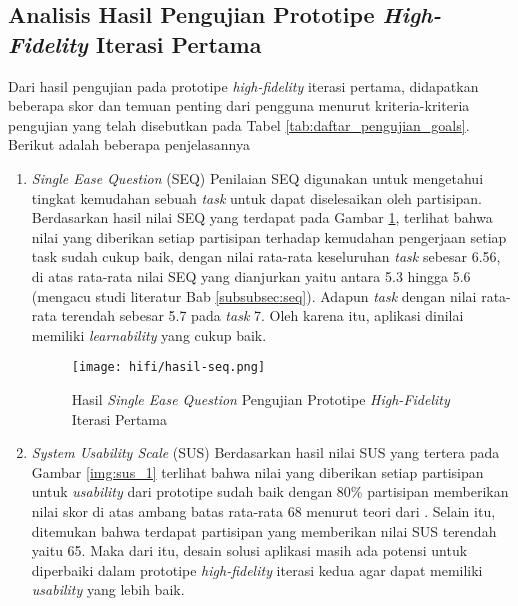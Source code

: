 \newpage

\subsection{Analisis Hasil Pengujian Prototipe \textit{High-Fidelity} Iterasi Pertama}
\label{subsec:test_1_analisis}

Dari hasil pengujian pada prototipe \textit{high-fidelity} iterasi pertama, didapatkan beberapa skor dan temuan penting dari pengguna menurut kriteria-kriteria pengujian yang telah disebutkan pada Tabel \ref{tab:daftar_pengujian_goals}. Berikut adalah beberapa penjelasannya

\begin{enumerate}
  \item \textit{Single Ease Question} (SEQ)
  \subitem  Penilaian SEQ digunakan untuk mengetahui tingkat kemudahan sebuah \textit{task} untuk dapat diselesaikan oleh partisipan. Berdasarkan hasil nilai SEQ yang terdapat pada Gambar \ref{img:seq_1}, terlihat bahwa nilai yang diberikan setiap partisipan terhadap kemudahan pengerjaan setiap task sudah cukup baik, dengan nilai rata-rata keseluruhan \textit{task} sebesar 6.56, di atas rata-rata nilai SEQ yang dianjurkan yaitu antara 5.3 hingga 5.6 (mengacu studi literatur Bab \ref{subsubsec:seq}). Adapun \textit{task} dengan nilai rata-rata terendah sebesar 5.7 pada \textit{task} 7. Oleh karena itu, aplikasi dinilai memiliki \textit{learnability} yang cukup baik. 

  \begin{figure}[h]
    \centering
    \texttt{[image: hifi/hasil-seq.png]}
    \caption{Hasil \textit{Single Ease Question} Pengujian Prototipe \textit{High-Fidelity} Iterasi Pertama}
    \label{img:seq_1}
  \end{figure}
  \FloatBarrier

  \item \textit{System Usability Scale} (SUS)
  \subitem  Berdasarkan hasil nilai SUS yang tertera pada Gambar \ref{img:sus_1} terlihat bahwa nilai yang diberikan setiap partisipan untuk \textit{usability} dari prototipe sudah baik dengan 80\% partisipan memberikan nilai skor di atas ambang batas rata-rata 68 menurut teori dari \textcite{sus2008bangor}. Selain itu, ditemukan bahwa terdapat partisipan yang memberikan nilai SUS terendah yaitu 65. Maka dari itu, desain solusi aplikasi masih ada potensi untuk diperbaiki dalam prototipe \textit{high-fidelity} iterasi kedua agar dapat memiliki \textit{usability} yang lebih baik. 


\end{enumerate}
